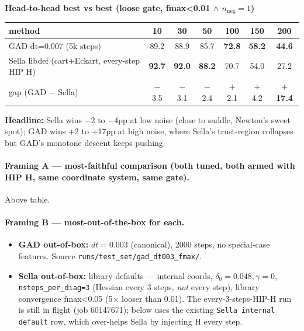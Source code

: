 \documentclass[11pt]{article}
\begin{document}
\begin{center}\small
\textbf{Head-to-head best vs best (loose gate, fmax<0.01 $\wedge$ $n_{\text{neg}}{=}1$)} \\[0.3em]
\begin{tabular}{l|cccccc}
\toprule
method                                            & 10 & 30 & 50 & 100 & 150 & 200 \\
\midrule
GAD dt=0.007 (5k steps)                           & 89.2 & 88.9 & 85.7 & \textbf{72.8} & \textbf{58.2} & \textbf{44.6} \\
Sella libdef (cart+Eckart, every-step HIP H)      & \textbf{92.7} & \textbf{92.0} & \textbf{88.2} & 70.7 & 54.0 & 27.2 \\
\midrule
gap (GAD $-$ Sella)                                & $-$3.5 & $-$3.1 & $-$2.4 & $+$2.1 & $+$4.2 & $+$\textbf{17.4} \\
\bottomrule
\end{tabular}
\end{center}

\textbf{Headline:} Sella wins $-$2 to $-$4pp at low noise (close to
saddle, Newton's sweet spot); GAD wins $+$2 to $+$17pp at high noise,
where Sella's trust-region collapses but GAD's monotone descent keeps
pushing.

\paragraph{Framing A — most-faithful comparison (both tuned, both armed
with HIP H, same coordinate system, same gate).} Above table.

\paragraph{Framing B — most-out-of-the-box for each.}
\begin{itemize}[leftmargin=1.5em]
\item \textbf{GAD out-of-box:} $dt=0.003$ (canonical), 2000 steps, no
  special-case features. Source \texttt{runs/test\_set/gad\_dt003\_fmax/}.
\item \textbf{Sella out-of-box:} library defaults — internal coords,
  $\delta_0{=}0.048, \gamma{=}0$, \texttt{nsteps\_per\_diag=3}
  (Hessian every 3 steps, \emph{not} every step), library convergence
  fmax<0.05 (5$\times$ looser than 0.01). The every-3-steps-HIP-H run
  is still in flight (job 60147671); below uses the existing
  \texttt{Sella internal default} row, which over-helps Sella by
  injecting H every step.
\end{itemize}
\end{document}
